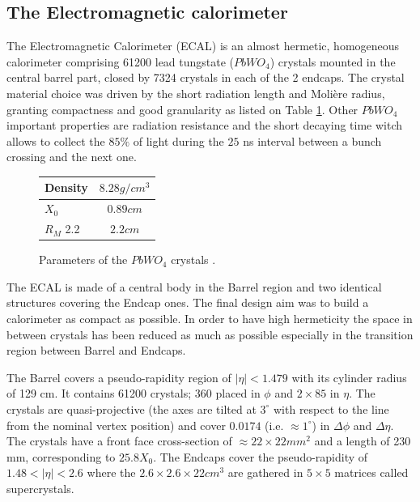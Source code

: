 \clearpage

\subsection{The Electromagnetic calorimeter}

The Electromagnetic Calorimeter (ECAL) is an almost hermetic, homogeneous calorimeter comprising 61200 lead tungstate ($PbWO_{4}$) crystals mounted in the central barrel part, closed by 7324 crystals in each of the 2 endcaps.
The crystal material choice was driven by the short radiation length and Molière radius, granting compactness and good granularity as listed on Table \ref{table:CMS_PbWO4}. Other $PbWO_{4}$ important properties are radiation resistance and the short decaying time witch allows to collect the $85\%$ of light during the $25$ ns interval between a bunch crossing and the next one.

\begin{figure}[tbh!]
	\begin{center}
		
		\begin{tabular}{ | l | c |}
			\hline
			Density  & $ 8.28 g/cm^{3}$ \\ \hline
			$X_{0}$   & $0.89 cm$  \\ \hline
			$R_{M}$ 2.2 & $2.2 cm$  \\ \hline
			\hline
		\end{tabular}
		\caption{Parameters of the $PbWO_{4}$ crystals .}
		\label{table:CMS_PbWO4}
	\end{center}
\end{figure}

The ECAL is made of a central body in the Barrel region and two identical structures covering the Endcap ones. The final design aim was to build a calorimeter as compact as possible. In order to have high hermeticity the space in between crystals has been reduced as much as possible especially in the transition region between Barrel and Endcaps. 

The Barrel covers a pseudo-rapidity region of $|\eta| < 1.479$ with its cylinder radius of 129 cm. It contains 61200 crystals; 360 placed in $\phi$ and $2\times85$ in $\eta$. The crystals are quasi-projective (the axes are tilted at $3^{\circ}$ with respect to the line from the nominal vertex position) and cover $0.0174$ (i.e. $\approx1^{\circ}$) in $\Delta\phi$ and $\Delta\eta$. The crystals have a front face cross-section of $\approx 22\times22 mm^{2}$ and a length of 230 mm, corresponding to $25.8 X_{0}$. The Endcaps cover the pseudo-rapidity of $1.48 < |\eta| < 2.6$ where the $2.6\times2.6\times22 cm^{3}$ are gathered in $5\times5$ matrices called supercrystals.

